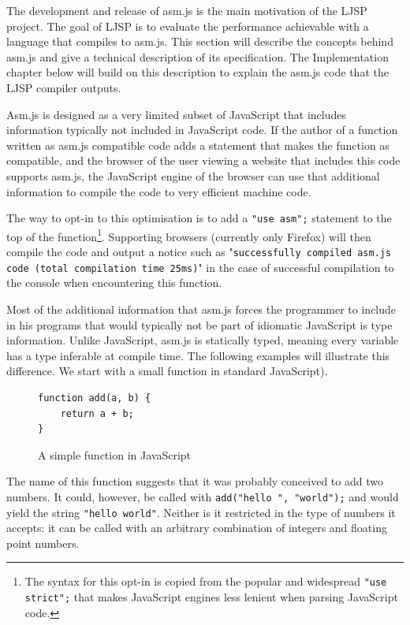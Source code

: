 \documentclass[11pt]{report}
\begin{document}
The development and release of asm.js is the main motivation of the LJSP project. The goal of LJSP is to evaluate the performance achievable with a language that compiles to asm.js. This section will describe the concepts behind asm.js and give a technical description of its specification. The Implementation chapter below will build on this description to explain the asm.js code that the LJSP compiler outputs.

Asm.js is designed as a very limited subset of JavaScript that includes information typically not included in JavaScript code. If the author of a function written as asm.js compatible code adds a statement that makes the function as compatible, and the browser of the user viewing a website that includes this code supports asm.js, the JavaScript engine of the browser can use that additional information to compile the code to very efficient machine code.

The way to opt-in to this optimisation is to add a \texttt{"use asm";} statement to the top of the function\footnote{The syntax for this opt-in is copied from the popular and widespread \texttt{"use strict";} that makes JavaScript engines less lenient when parsing JavaScript code.}. Supporting browsers (currently only Firefox) will then compile the code and output a notice such as "\texttt{successfully compiled asm.js code (total compilation time 25ms)}" in the case of successful compilation to the console when encountering this function.

Most of the additional information that asm.js forces the programmer to include in his programs that would typically not be part of idiomatic JavaScript is type information. Unlike JavaScript, asm.js is statically typed, meaning every variable has a type inferable at compile time. The following examples will illustrate this difference. We start with a small function in standard JavaScript).

\begin{figure}[ht]
\begin{lstlisting}
function add(a, b) {
    return a + b;
}
\end{lstlisting}
\caption{A simple function in JavaScript}
\label{jssimplefunc}
\end{figure}

The name of this function suggests that it was probably conceived to add two numbers. It could, however, be called with \texttt{add("hello ", "world");} and would yield the string \texttt{"hello world"}. Neither is it restricted in the type of numbers it accepts: it can be called with an arbitrary combination of integers and floating point numbers.
\end{document}
